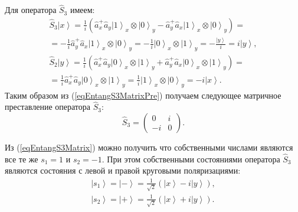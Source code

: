 Для оператора $\hat{S}_3$ имеем:
\begin{eqnarray}
  \hat{S}_3 \left|x\right> = \frac{1}{i}\left(\hat{a}_x^{+} \hat{a}_y
\left|1\right>_x\otimes\left|0\right>_y - \hat{a}_y^{+}
\hat{a}_x\left|1\right>_x\otimes\left|0\right>_y\right) =
\nonumber \\
= 
-\frac{1}{i}\hat{a}_y^{+}
\hat{a}_x\left|1\right>_x\otimes\left|0\right>_y =
-\frac{1}{i}\left|0\right>_x\otimes\left|1\right>_y =
-\frac{\left|y\right>}{i} = i \left|y\right>,
\nonumber \\
\hat{S}_2 \left|y\right> = \frac{1}{i}\left(\hat{a}_x^{+} \hat{a}_y
\left|0\right>_x\otimes\left|1\right>_y + \hat{a}_y^{+}
\hat{a}_x\left|0\right>_x\otimes\left|1\right>_y\right) =
\nonumber \\
=
\frac{1}{i}\hat{a}_x^{+} \hat{a}_y
\left|0\right>_x\otimes\left|1\right>_y
=\frac{1}{i}\left|1\right>_x\otimes\left|0\right>_y =
-i \left|x\right>.
\label{eqEntangS3MatrixPre}
\end{eqnarray}
Таким образом из (\ref{eqEntangS3MatrixPre}) получаем следующее
матричное преставление оператора $\hat{S}_3$:
\begin{equation}
\hat{S}_3 = 
\left(
\begin{array}{cc}
0 & i \\
-i & 0 
\end{array}
\right).
\label{eqEntangS3Matrix}
\end{equation}


Из (\ref{eqEntangS3Matrix}) можно получить что собственными числами
являются все те же $s_1 = 1$ и $s_2 = -1$. При этом собственными
состояниями оператора $\hat{S}_3$ являются состояния с левой и правой
круговыми поляризациями:
\begin{eqnarray}
  \left| s_1 \right> = \left| - \right> = \frac{1}{\sqrt{2}}
  \left(
  \left|x\right> - i \left|y\right>
  \right),
  \nonumber \\
  \left| s_2 \right> = \left| + \right> = \frac{1}{\sqrt{2}}
  \left(
  \left|x\right> + i \left|y\right>
  \right).
  \label{eqEntangS3Eigenvec}
\end{eqnarray}


